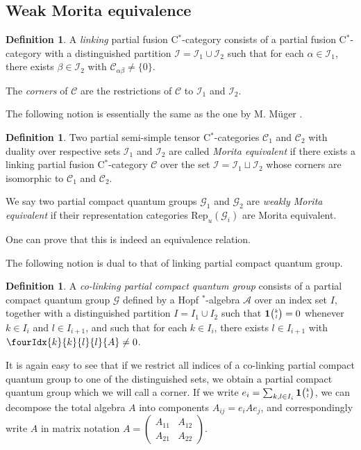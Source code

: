 \documentclass[10pt]{article}
\newcommand{\CatC}{\mathcal{C}}
\newcommand{\CatCC}{\mathscr{C}}
\newcommand{\Rep}{\mathrm{Rep}}
\newcommand{\Grt}[3]{#1{\tiny {\begin{pmatrix} #2\\#3\end{pmatrix}}}}
\newcommand{\UnitC}[2]{\Grt{\mathbf{1}}{#1}{#2}}
\newcommand{\Gr}[5]{\fourIdx{#2}{#4}{#3}{#5}{#1}}%
\theoremstyle{definition}
\newtheorem{Def}[Theorem]{Definition}
\numberwithin{equation}{section}
\begin{document}
\subsection{Weak Morita equivalence}

\begin{Def} A \emph{linking} partial fusion C$^*$-category consists of a partial fusion C$^*$-category with a distinguished partition $\mathscr{I} =\mathscr{I}_1 \cup \mathscr{I}_2$ such that for each $\alpha\in \mathscr{I}_1$, there exists $\beta \in \mathscr{I}_{2}$ with $\CatC_{\alpha\beta}\neq \{0\}$.

The \emph{corners} of $\CatCC$ are the restrictions of $\CatCC$ to $\mathscr{I}_1$ and $\mathscr{I}_2$.
\end{Def}

The following notion is essentially the same as the one by M. M\"{u}ger \cite{Mug1}. 

\begin{Def} Two partial semi-simple tensor C$^*$-categories $\CatCC_1$ and $\CatCC_2$ with duality over respective sets $\mathscr{I}_1$ and $\mathscr{I}_2$ are called \emph{Morita equivalent} if there exists a linking partial fusion C$^*$-category $\CatCC$ over the set $\mathscr{I}=\mathscr{I}_1\sqcup \mathscr{I}_2$ whose corners are isomorphic to $\CatCC_1$ and $\CatCC_2$.

We say two partial compact quantum groups $\mathscr{G}_1$ and $\mathscr{G}_2$ are \emph{weakly Morita equivalent} if their representation categories $\Rep_u(\mathscr{G}_i)$ are Morita equivalent. 
\end{Def} 

One can prove that this is indeed an equivalence relation. 

The following notion is dual to that of linking partial compact quantum group.

\begin{Def}\label{DefCoLink} A \emph{co-linking partial compact quantum group} consists of a partial compact quantum group $\mathscr{G}$ defined by a Hopf $^*$-algebra $\mathscr{A}$ over an index set $I$, together with a distinguished partition $I = I_1\cup I_2$ such that  $\UnitC{k}{l}=0$ whenever $k\in I_i$ and $l\in I_{i+1}$, and such that for each $k\in I_i$, there exists $l\in I_{i+1}$ with $\Gr{A}{k}{l}{k}{l}\neq 0$.  
\end{Def} 

It is again easy to see that if we restrict all indices of a co-linking partial compact quantum group to one of the distinguished sets, we obtain a partial compact quantum group which we will call a corner. If we write $e_i = \sum_{k,l\in I_i} \UnitC{k}{l}$, we can decompose the total algebra $A$ into components $A_{ij} = e_{i}Ae_{j}$, and correspondingly write $A$ in matrix notation $A = \begin{pmatrix} A_{11} & A_{12}  \\ A_{21} & A_{22}\end{pmatrix}$.
\end{document}
